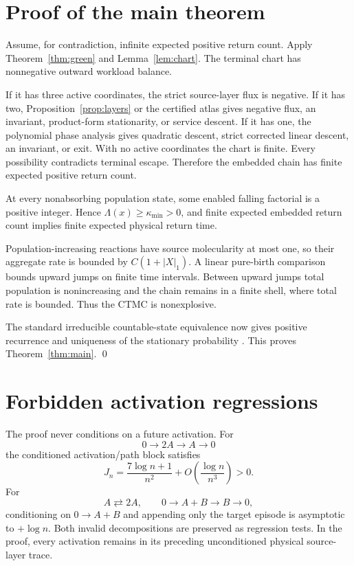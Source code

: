 \documentclass[11pt]{article}
\begin{document}
\section{Proof of the main theorem}

Assume, for contradiction, infinite expected positive return count.  Apply
Theorem~\ref{thm:green} and Lemma~\ref{lem:chart}.  The terminal chart has
nonnegative outward workload balance.

If it has three active coordinates, the strict source-layer flux is negative.
If it has two, Proposition~\ref{prop:layers} or the certified atlas gives
negative flux, an invariant, product-form stationarity, or service descent.
If it has one, the polynomial phase analysis gives quadratic descent, strict
corrected linear descent, an invariant, or exit.  With no active coordinates
the chart is finite.  Every possibility contradicts terminal escape.
Therefore the embedded chain has finite expected positive return count.

At every nonabsorbing population state, some enabled falling factorial is a
positive integer.  Hence \(\Lambda(x)\ge\kappa_{\min}>0\), and finite expected
embedded return count implies finite expected physical return time.

Population-increasing reactions have source molecularity at most one, so
their aggregate rate is bounded by \(C(1+|X|_1)\).  A linear pure-birth
comparison bounds upward jumps on finite time intervals.  Between upward
jumps total population is nonincreasing and the chain remains in a finite
shell, where total rate is bounded.  Thus the CTMC is nonexplosive.

The standard irreducible countable-state equivalence now gives positive
recurrence and uniqueness of the stationary probability
\cite{Norris1997}.  This proves Theorem~\ref{thm:main}. \qed

\appendix
\section{Forbidden activation regressions}

The proof never conditions on a future activation.  For
\[
 0\to2A\to A\to0
\]
the conditioned activation/path block satisfies
\[
 J_n=\frac{7\log n+1}{n^2}
      +O\!\left(\frac{\log n}{n^3}\right)>0.
\]
For
\[
 A\rightleftarrows2A,\qquad
 0\to A+B\to B\to0,
\]
conditioning on \(0\to A+B\) and appending only the target episode is
asymptotic to \(+\log n\).  Both invalid decompositions are preserved as
regression tests.  In the proof, every activation remains in its preceding
unconditioned physical source-layer trace.
\end{document}
